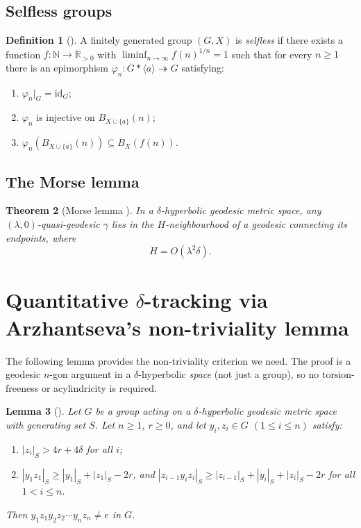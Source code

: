 \documentclass[12pt]{amsart}
\theoremstyle{plain}
\newtheorem{theorem}{Theorem}[section]
\newtheorem{lemma}[theorem]{Lemma}
\theoremstyle{definition}
\newtheorem{definition}[theorem]{Definition}
\newcommand{\N}{\mathbb{N}}
\begin{document}
\subsection{Selfless groups}

\begin{definition}[{\cite[Definition~3.1]{AGKE}}]\label{def:selfless}
A finitely generated group $(G,X)$ is \emph{selfless} if there exists a
function $f\colon\N\to\mathbb{R}_{>0}$ with $\liminf_{n\to\infty} f(n)^{1/n} = 1$
such that for every $n \geq 1$ there is an epimorphism
$\varphi_n \colon G * \langle a \rangle \twoheadrightarrow G$ satisfying:
\begin{enumerate}
  \item $\varphi_n|_G = \mathrm{id}_G$;
  \item $\varphi_n$ is injective on $B_{X\cup\{a\}}(n)$;
  \item $\varphi_n\!\left(B_{X\cup\{a\}}(n)\right) \subseteq B_X(f(n))$.
\end{enumerate}
\end{definition}

\subsection{The Morse lemma}

\begin{theorem}[Morse lemma {\cite[Chapter~11]{BuyaloSchroeder}}]\label{thm:morse}
In a $\delta$-hyperbolic geodesic metric space, any $(\lambda,0)$-quasi-geodesic
$\gamma$ lies in the $H$-neighbourhood of a geodesic connecting its endpoints,
where
\[
  H = O(\lambda^2\delta).
\]
\end{theorem}

\section{Quantitative \texorpdfstring{\boldmath$\delta$}{delta}-tracking via Arzhantseva's non-triviality lemma}
\label{sec:quantitative}

The following lemma \cite[Lemma~13]{Arz01} provides the non-triviality
criterion we need. The proof is a geodesic $n$-gon argument in a
$\delta$-hyperbolic \emph{space} (not just a group), so no torsion-freeness
or acylindricity is required.

\begin{lemma}[{\cite[Lemma~13]{Arz01}}]\label{lem:arz13}
Let $G$ be a group acting on a $\delta$-hyperbolic geodesic metric space
with generating set $S$.
Let $n \geq 1$, $r \geq 0$, and let $y_i, z_i \in G$ $(1 \leq i \leq n)$ satisfy:
\begin{enumerate}[label=(\arabic*)]
  \item\label{it:arz-z} $|z_i|_S > 4r + 4\delta$ for all $i$;
  \item\label{it:arz-prod}
    $|y_1 z_1|_S \geq |y_1|_S + |z_1|_S - 2r$, and
    $|z_{i-1} y_i z_i|_S \geq |z_{i-1}|_S + |y_i|_S + |z_i|_S - 2r$
    for all $1 < i \leq n$.
\end{enumerate}
Then $y_1 z_1 y_2 z_2 \cdots y_n z_n \neq e$ in $G$.
\end{lemma}
\end{document}
